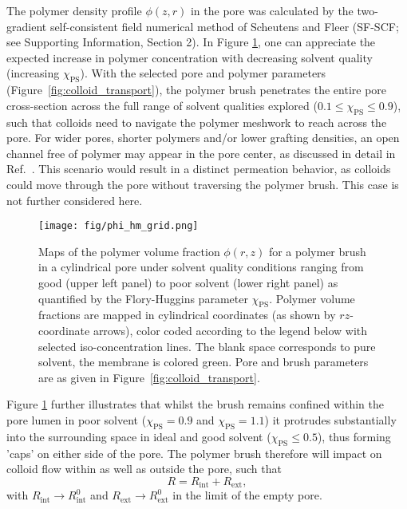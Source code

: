 \documentclass[12pt, a4paper]{article}
\begin{document}
The polymer density profile $\phi(z,r)$ in the pore was calculated by the two-gradient self-consistent field numerical method of Scheutens and Fleer (SF-SCF; see Supporting Information, Section 2).
In Figure \ref{fig:phi_hm_grid}, one can appreciate the expected increase in polymer concentration with decreasing solvent quality (increasing $\chi_{\text{PS}}$).
With the selected pore and polymer parameters (Figure~\ref{fig:colloid_transport}), the polymer brush penetrates the entire pore cross-section across the full range of solvent qualities explored ($0.1\le\chi_{\text{PS}}\le0.9$), such that colloids need to navigate the polymer meshwork to reach across the pore.
For wider pores, shorter polymers and/or lower grafting densities, an open channel free of polymer may appear in the pore center, as discussed in detail in Ref.~\cite{Laktionov2021}.
This scenario would result in a distinct permeation behavior, as colloids could move through the pore without traversing the polymer brush.
This case is not further considered here.

\begin{figure}
    \centering
    \texttt{[image: fig/phi\_hm\_grid.png]}
    \caption{
    Maps of the polymer volume fraction $\phi(r,z)$ for a polymer brush in a cylindrical pore under solvent quality conditions ranging from good (upper left panel) to poor solvent (lower right panel) as quantified by the Flory-Huggins parameter $\chi_{\text{PS}}$.
    Polymer volume fractions are mapped in cylindrical coordinates (as shown by $rz$-coordinate arrows), color coded according to the legend below with selected iso-concentration lines. The blank space corresponds to pure solvent, the membrane is colored green.
    Pore and brush parameters are as given in Figure~\ref{fig:colloid_transport}.
    }
    \label{fig:phi_hm_grid}
\end{figure}

Figure \ref{fig:phi_hm_grid} further illustrates that whilst the brush remains confined within the pore lumen in poor solvent ($\chi_{\text{PS}}=0.9$ and $\chi_{\text{PS}}=1.1$) it protrudes substantially into the surrounding space in ideal and good solvent ($\chi_{\text{PS}}\le0.5$), thus forming 'caps' on either side of the pore.
The polymer brush therefore will impact on colloid flow within as well as outside the pore, such that
\begin{equation}
    R=R_{\text{int}}+R_{\text{ext}},
    \label{eq:R_tot_tot}
\end{equation}
with $R_{\text{int}}\rightarrow R_{\text{int}}^{0}$ and $R_{\text{ext}}\rightarrow R_{\text{ext}}^{0}$ in the limit of the empty pore.
\end{document}
